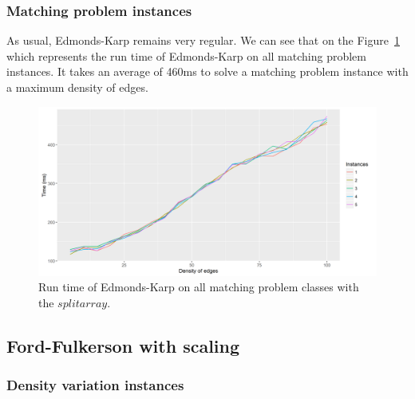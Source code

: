 \subsubsection{Matching problem instances}
As usual, Edmonds-Karp remains very regular. We can see that on the Figure~\ref{fig:ekmatching} which represents the run time of Edmonds-Karp on all matching problem instances. It takes an average of 460ms to solve a matching problem instance with a maximum density of edges.
\begin{figure}[H]
\begin{center}
\includegraphics[scale=0.55]{images/results/ekmatching.png}
\caption{Run time of Edmonds-Karp on all matching problem classes with the $split array$.}
\label{fig:ekmatching}
\end{center}
\end{figure}


\subsection{Ford-Fulkerson with scaling}
\subsubsection{Density variation instances}

